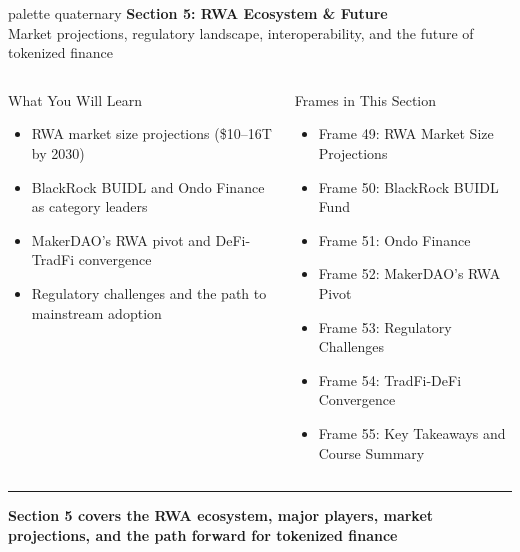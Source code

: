 \documentclass[8pt,aspectratio=169]{beamer}
\newcommand{\bottomnote}[1]{\vfill\vspace{-2mm}\textcolor{mllavender2}{\rule{\textwidth}{0.4pt}}\vspace{1mm}\footnotesize\textbf{#1}}
\begin{document}
\begin{frame}{}
\begin{beamercolorbox}[sep=12pt,center,rounded=true,shadow=true]{palette quaternary}
  {\Large\bfseries Section 5: RWA Ecosystem \& Future}\\[6pt]
  {\normalsize Market projections, regulatory landscape, interoperability, and the future of tokenized finance}
\end{beamercolorbox}
\vspace{4mm}
\begin{columns}[T]
\begin{block}{What You Will Learn}
\footnotesize
\begin{itemize}
  \item RWA market size projections (\$10--16T by 2030)
  \item BlackRock BUIDL and Ondo Finance as category leaders
  \item MakerDAO's RWA pivot and DeFi-TradFi convergence
  \item Regulatory challenges and the path to mainstream adoption
\end{itemize}
\end{block}
\begin{block}{Frames in This Section}
\footnotesize
\begin{itemize}
  \item Frame 49: RWA Market Size Projections
  \item Frame 50: BlackRock BUIDL Fund
  \item Frame 51: Ondo Finance
  \item Frame 52: MakerDAO's RWA Pivot
  \item Frame 53: Regulatory Challenges
  \item Frame 54: TradFi-DeFi Convergence
  \item Frame 55: Key Takeaways and Course Summary
\end{itemize}
\end{block}
\end{columns}
\bottomnote{Section 5 covers the RWA ecosystem, major players, market projections, and the path forward for tokenized finance}
\end{frame}
\end{document}
